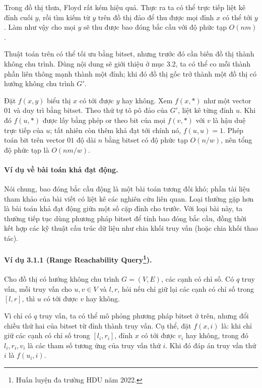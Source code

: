 \documentclass[11pt]{article}
\begin{document}
Trong đồ thị thưa, Floyd rất kém hiệu quả. Thực ra ta có thể trực tiếp liệt kê
đỉnh cuối $y$, rồi tìm kiếm từ $y$ trên đồ thị đảo để thu được mọi đỉnh $x$ có
thể tới $y$. Làm như vậy cho mọi $y$ sẽ thu được bao đóng bắc cầu với độ phức
tạp $O(nm)$.

Thuật toán trên có thể tối ưu bằng bitset, nhưng trước đó cần biến đồ thị thành
không chu trình. Dùng nội dung sẽ giới thiệu ở mục 3.2, ta có thể co mỗi thành
phần liên thông mạnh thành một đỉnh; khi đó đồ thị gốc trở thành một đồ thị có
hướng không chu trình $G'$.

Đặt $f(x,y)$ biểu thị $x$ có tới được $y$ hay không. Xem $f(x,*)$ như một vector
$01$ và duy trì bằng bitset. Theo thứ tự tô pô đảo của $G'$, liệt kê từng đỉnh
$u$. Khi đó $f(u,*)$ được lấy bằng phép or theo bit của mọi $f(v,*)$ với $v$ là
hậu duệ trực tiếp của $u$; tất nhiên còn thêm khả đạt tới chính nó,
$f(u,u)=1$. Phép toán bit trên vector $01$ độ dài $n$ bằng bitset có độ phức tạp
$O(n/w)$, nên tổng độ phức tạp là $O(nm/w)$.

\paragraph{Ví dụ về bài toán khả đạt động.}
Nói chung, bao đóng bắc cầu động là một bài toán tương đối khó; phần tài liệu
tham khảo của bài viết có liệt kê các nghiên cứu liên quan. Loại thường gặp hơn
là bài toán khả đạt động giữa một số cặp đỉnh cho trước. Với loại bài này, ta
thường tiếp tục dùng phương pháp bitset để tính bao đóng bắc cầu, đồng thời kết
hợp các kỹ thuật cấu trúc dữ liệu như chia khối truy vấn (hoặc chia khối thao
tác).

\paragraph{Ví dụ 3.1.1 (Range Reachability Query\protect\footnote{Huấn luyện đa trường HDU năm 2022.}).}
Cho đồ thị có hướng không chu trình $G=(V,E)$, các cạnh có chỉ số. Có $q$ truy
vấn, mỗi truy vấn cho $u,v\in V$ và $l,r$, hỏi nếu chỉ giữ lại các cạnh có chỉ
số trong $[l,r]$, thì $u$ có tới được $v$ hay không.

Vì chỉ có $q$ truy vấn, ta có thể mô phỏng phương pháp bitset ở trên, nhưng đổi
chiều thứ hai của bitset từ đỉnh thành truy vấn. Cụ thể, đặt $f(x,i)$ là: khi
chỉ giữ các cạnh có chỉ số trong $[l_i,r_i]$, đỉnh $x$ có tới được $v_i$ hay
không, trong đó $l_i,r_i,v_i$ là các tham số tương ứng của truy vấn thứ $i$. Khi
đó đáp án truy vấn thứ $i$ là $f(u_i,i)$.
\end{document}
